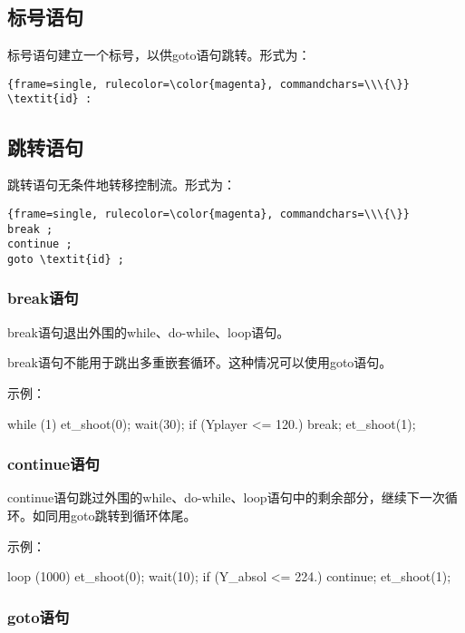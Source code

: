 \documentclass{article}
\begin{document}
\subsection{标号语句}

标号语句建立一个标号，以供goto语句跳转。形式为：

\begin{Verbatim}{frame=single, rulecolor=\color{magenta}, commandchars=\\\{\}}
\textit{id} :
\end{Verbatim}

\subsection{跳转语句}

跳转语句无条件地转移控制流。形式为：

\begin{Verbatim}{frame=single, rulecolor=\color{magenta}, commandchars=\\\{\}}
break ;
continue ;
goto \textit{id} ;
\end{Verbatim}

\subsubsection{break语句}

break语句退出外围的while、do-while、loop语句。

break语句不能用于跳出多重嵌套循环。这种情况可以使用goto语句。

示例：

\begin{MUAvbt}
while (1) {
	et_shoot(0);
	wait(30);
	if (Yplayer <= 120.)
		break;
}
et_shoot(1);
\end{MUAvbt}

\subsubsection{continue语句}

continue语句跳过外围的while、do-while、loop语句中的剩余部分，继续下一次循环。如同用goto跳转到循环体尾。

示例：

\begin{MUAvbt}
loop (1000) {
	et_shoot(0);
	wait(10);
	if (Y_absol <= 224.)
		continue;
	et_shoot(1);
}
\end{MUAvbt}

\subsubsection{goto语句}
\end{document}
